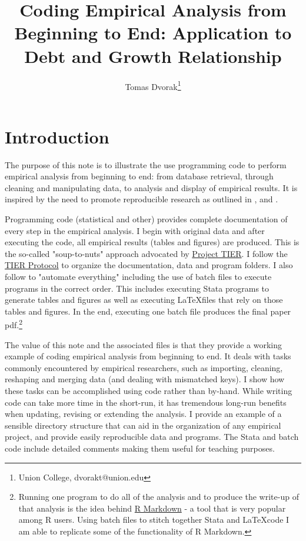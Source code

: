 \documentclass[letterpaper,11pt]{article}
\begin{document}
\title{\vspace{-0.5in} Coding Empirical Analysis from Beginning to End: Application to Debt and Growth Relationship}
\author{Tomas Dvorak\thanks{Union College, dvorakt@union.edu}}

\maketitle

\section{Introduction}

The purpose of this note is to illustrate the use programming code to perform empirical analysis from beginning to end: from database retrieval, through cleaning and manipulating data, to analysis and display of empirical results. It is inspired by the need to promote reproducible research as outlined in \cite{ball2012teaching}, \cite{gentzkow2014code} and \cite{hoffler2017replication}. 

Programming code (statistical and other) provides complete documentation of every step in the empirical analysis. I begin with original data and after executing the code, all empirical results (tables and figures) are produced. This is the so-called "soup-to-nuts" approach advocated by \href{http://www.projecttier.org/}{Project TIER}. I follow the \href{http://www.projecttier.org/tier-protocol/}{TIER Protocol} to organize the documentation, data and program folders. I also follow \cite{gentzkow2014code} to "automate everything" including the use of batch files to execute programs in the correct order. This includes executing Stata programs to generate tables and figures as well as executing \LaTeX files that rely on those tables and figures. In the end, executing one batch file produces the final paper pdf.\footnote{Running one program to do all of the analysis and to produce the write-up of that analysis is the idea behind \href{http://rmarkdown.rstudio.com/}{R Markdown} - a tool that is very popular among R users. Using batch files to stitch together Stata and \LaTeX code I am able to replicate some of the functionality of R Markdown.}

The value of this note and the associated files is that they provide a working example of coding empirical analysis from beginning to end. It deals with tasks commonly encountered by empirical researchers, such as importing, cleaning, reshaping and merging data (and dealing with mismatched keys). I show how these tasks can be accomplished using code rather than by-hand. While writing code can take more time in the short-run, it has tremendous long-run benefits when updating, revising or extending the analysis. I provide an example of a sensible directory structure that can aid in the organization of any empirical project, and provide easily reproducible data and programs. The Stata and batch code include detailed comments making them useful for teaching purposes. 
 
\end{document}
